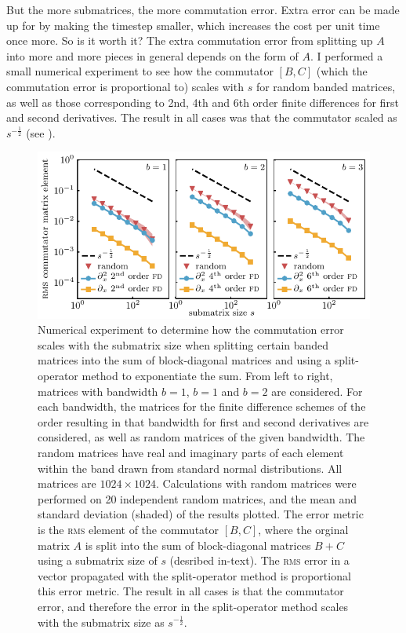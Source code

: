 But the more submatrices, the more commutation error. Extra error can be made up for by making the timestep smaller, which increases the cost per unit time once more. So is it worth it? The extra commutation error from splitting up $A$ into more and more pieces in general depends on the form of $A$. I performed a small numerical experiment to see how the commutator $[B, C]$ (which the commutation error is proportional to) scales with $s$ for random banded matrices, as well as those corresponding to 2nd, 4th and 6th order finite differences for first and second derivatives. The result in all cases was that the commutator scaled as $s^{-\frac12}$ (see ).

\begin{figure}[t]
    \centerfloat
    \includegraphics[width=\textwidth]{figures/numerics/commutation_error.pdf}
    \caption{Numerical experiment to determine how the commutation error scales with the submatrix size when splitting certain banded matrices into the sum of block-diagonal matrices and using a split-operator method to exponentiate the sum. From left to right, matrices with bandwidth $b=1$, $b=1$ and $b=2$ are considered. For each bandwidth, the matrices for the finite difference schemes of the order resulting in that bandwidth for first and second derivatives are considered, as well as random matrices of the given bandwidth. The random matrices have real and imaginary parts of each element within the band drawn from standard normal distributions. All matrices are $1024\times1024$. Calculations with random matrices were performed on 20 independent random matrices, and the mean and standard deviation (shaded) of the results plotted. The error metric is the \textsc{rms} element of the commutator $[B, C]$, where the orginal matrix $A$ is split into the sum of block-diagonal matrices $B + C$ using a submatrix size of $s$ (desribed in-text). The \textsc{rms} error in a vector propagated with the split-operator method is proportional this error metric. The result in all cases is that the commutator error, and therefore the error in the split-operator method scales with the submatrix size as $s^{-\frac12}$.}
    \label{fig:commutation_error}
\end{figure}

